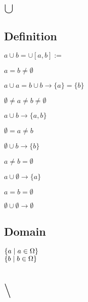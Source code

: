 \documentclass[11pt]{article}
\begin{document}
\newpage
\section{$\cup$}
\subsection{Definition}
\vspace{1mm}
\begin{center}
$
a  \cup  b = \cup[a,b] := 
$
\end{center}
$a = b \neq \emptyset$
\begin{center}
$
a  \cup  a = b \cup b \rightarrow \{a\} = \{b\}
$
\end{center}
\vspace{2mm}
$\emptyset \neq a \neq b \neq \emptyset$
\begin{center}
$
a \cup  b \rightarrow \{a,b\}
$
\end{center}
\vspace{2mm}
$\emptyset = a \neq b$
\begin{center}
$
\emptyset \cup  b \rightarrow \{b\}
$
\end{center}
\vspace{2mm}
$a \neq b = \emptyset$
\begin{center}
$
a \cup \emptyset \rightarrow \{a\}
$
\end{center}
\vspace{2mm}
$a = b = \emptyset$
\begin{center}
$
\emptyset \cup \emptyset \rightarrow \emptyset
$
\end{center}
\subsection{Domain}
\begin{center}
$
\{ a \hspace{1mm} | \hspace{1mm} a \in \Omega\}
$
\\ \vspace{2mm}
$
\{ b \hspace{1mm}|\hspace{1mm} b \in \Omega\}
$
\end{center}






\newpage
\section{$\setminus$}
\end{document}
